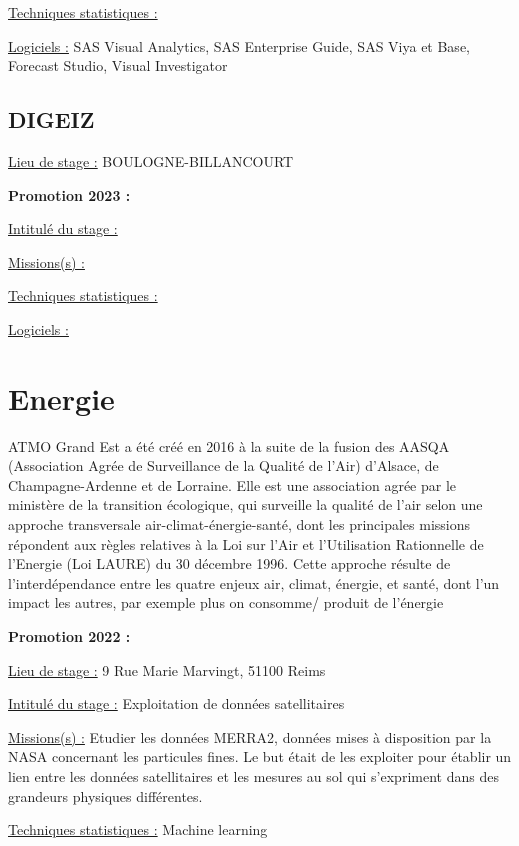 \documentclass[
  letterpaper,
  DIV=11,
  numbers=noendperiod]{scrreprt}
\begin{document}
\uline{Techniques statistiques :}

\uline{Logiciels :} SAS Visual Analytics, SAS Enterprise Guide, SAS Viya
et Base, Forecast Studio, Visual Investigator

\hypertarget{digeiz}{%
\section{\texorpdfstring{\textbf{DIGEIZ}}{DIGEIZ}}\label{digeiz}}

\uline{Lieu de stage :} BOULOGNE-BILLANCOURT

\textbf{Promotion 2023 :}

\uline{Intitulé du stage :}

\uline{Missions(s) :}

\uline{Techniques statistiques :}

\uline{Logiciels :}


\hypertarget{energie}{%
\chapter{Energie}\label{energie}}

ATMO Grand Est a été créé en 2016 à la suite de la fusion des AASQA
(Association Agrée de Surveillance de la Qualité de l'Air) d'Alsace, de
Champagne-Ardenne et de Lorraine. Elle est une association agrée par le
ministère de la transition écologique, qui surveille la qualité de l'air
selon une approche transversale air-climat-énergie-santé, dont les
principales missions répondent aux règles relatives à la Loi sur l'Air
et l'Utilisation Rationnelle de l'Energie (Loi LAURE) du 30 décembre
1996. Cette approche résulte de l'interdépendance entre les quatre
enjeux air, climat, énergie, et santé, dont l'un impact les autres, par
exemple plus on consomme/ produit de l'énergie

\textbf{Promotion 2022 :}

\uline{Lieu de stage :} 9 Rue Marie Marvingt, 51100 Reims

\uline{Intitulé du stage :} Exploitation de données satellitaires

\uline{Missions(s) :} Etudier les données MERRA2, données mises à
disposition par la NASA concernant les particules fines. Le but était de
les exploiter pour établir un lien entre les données satellitaires et
les mesures au sol qui s'expriment dans des grandeurs physiques
différentes.

\uline{Techniques statistiques :} Machine learning
\end{document}
